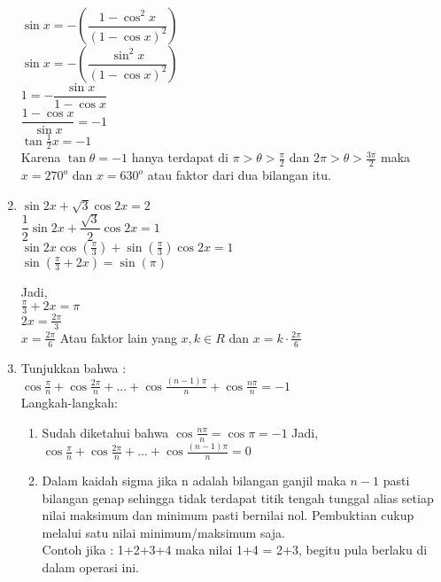 \documentclass[12pt,a4paper]{article}
\begin{document}
\begin{enumerate}
			   $\sin x=-(\dfrac{1-\cos^2 x}{(1-\cos x)^2})$\medskip \\
			   $\sin x=-(\dfrac{\sin^2 x}{(1-\cos x)^2})$\medskip \\
			   $1 =-\dfrac{\sin x}{1-\cos x}$\medskip \\
			   $\dfrac{1-\cos x}{\sin x}=-1$\medskip \\
			   $\tan \frac{1}{2}x=-1$\medskip \\
			   
			   Karena $\tan \theta = -1$ hanya terdapat di $\pi>\theta>\frac{\pi}{2}$ dan $2\pi>\theta>\frac{3\pi}{2}$  maka $x=270^o$ dan $x=630^o$ atau faktor dari dua bilangan itu.
			   
			   
			\item $\sin 2x + \sqrt{3}\cos 2x=2$\medskip	\\
				  $\dfrac{1}{2}\sin 2x + \dfrac{\sqrt{3}}{2}\cos 2x=1$\medskip	\\
				  $\sin2x\cos(\frac{\pi}{3})+\sin(\frac{\pi}{3})\cos2x=1$\medskip \\
				  $\sin(\frac{\pi}{3}+2x)=\sin(\pi)$
				  
				  Jadi,\\
				   $\frac{\pi}{3}+2x=\pi$\medskip \\
					    $2x=\frac{2\pi}{3}$\medskip \\
					    $x=\frac{2\pi}{6}$
				   Atau faktor lain yang $x,k\in R$ dan $x=k\cdot\frac{2\pi}{6}$
			\item Tunjukkan bahwa :\medskip \\
				  $\cos\frac{\pi}{n}+\cos\frac{2\pi}{n}+...+\cos\frac{(n-1)\pi}{n}+\cos\frac{n\pi}{n}=-1 $\medskip \\
				  Langkah-langkah: 	   
				  \begin{enumerate}
				  	\item Sudah diketahui bahwa $\cos\frac{n\pi}{n}=\cos \pi=-1$ Jadi, $\cos\frac{\pi}{n}+\cos\frac{2\pi}{n}+...+\cos\frac{(n-1)\pi}{n}=0$ 
				  	\item Dalam kaidah sigma jika n adalah bilangan ganjil maka $n-1$ pasti bilangan genap sehingga tidak terdapat titik tengah tunggal alias setiap nilai maksimum dan minimum pasti bernilai nol. Pembuktian cukup melalui satu nilai minimum/maksimum saja.\medskip \\
				  	Contoh jika : 1+2+3+4 maka nilai 1+4 = 2+3, begitu pula berlaku di dalam operasi ini.\\
				  	

\end{enumerate}
\end{enumerate}
\end{document}
